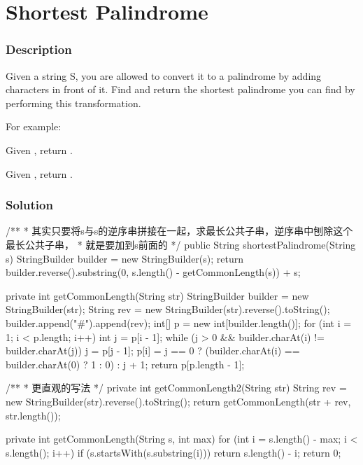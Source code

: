 \newpage

\section{Shortest Palindrome} %

\subsubsection{Description}
Given a string S, you are allowed to convert it to a palindrome by adding characters in front of it. Find and return the shortest palindrome you can find by performing this transformation.

For example:

Given , return .

Given , return .

\subsubsection{Solution}

\begin{Code}
/**
 * 其实只要将s与s的逆序串拼接在一起，求最长公共子串，逆序串中刨除这个最长公共子串，
 * 就是要加到s前面的
 */
public String shortestPalindrome(String s) {
    StringBuilder builder = new StringBuilder(s);
    return builder.reverse().substring(0, s.length() - getCommonLength(s)) + s;
}

private int getCommonLength(String str) {
    StringBuilder builder = new StringBuilder(str);
    String rev = new StringBuilder(str).reverse().toString();
    builder.append("#").append(rev);
    int[] p = new int[builder.length()];
    for (int i = 1; i < p.length; i++) {
        int j = p[i - 1];
        while (j > 0 && builder.charAt(i) != builder.charAt(j)) j = p[j - 1];
        p[i] = j == 0 ? (builder.charAt(i) == builder.charAt(0) ? 1 : 0) : j + 1;
    }
    return p[p.length - 1];
}

/**
 * 更直观的写法
 */
private int getCommonLength2(String str) {
    String rev = new StringBuilder(str).reverse().toString();
    return getCommonLength(str + rev, str.length());
}

private int getCommonLength(String s, int max) {
    for (int i = s.length() - max; i < s.length(); i++) {
        if (s.startsWith(s.substring(i))) {
            return s.length() - i;
        }
    }
    return 0;
}
\end{Code}

